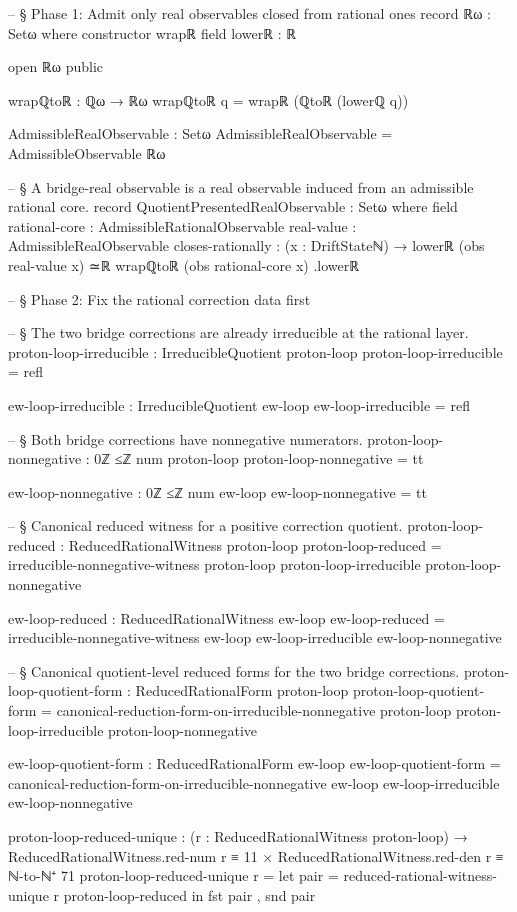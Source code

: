 \documentclass[11pt,a4paper]{book}
\begin{document}
\begin{code}
-- § Phase 1: Admit only real observables closed from rational ones
record ℝω : Setω where
  constructor wrapℝ
  field
    lowerℝ : ℝ

open ℝω public

wrapℚtoℝ : ℚω → ℝω
wrapℚtoℝ q = wrapℝ (ℚtoℝ (lowerℚ q))

AdmissibleRealObservable : Setω
AdmissibleRealObservable = AdmissibleObservable ℝω

-- § A bridge-real observable is a real observable induced from an admissible rational core.
record QuotientPresentedRealObservable : Setω where
  field
    rational-core : AdmissibleRationalObservable
    real-value    : AdmissibleRealObservable
    closes-rationally :
      (x : DriftStateℕ) →
      lowerℝ (obs real-value x) ≃ℝ wrapℚtoℝ (obs rational-core x) .lowerℝ

-- § Phase 2: Fix the rational correction data first

-- § The two bridge corrections are already irreducible at the rational layer.
proton-loop-irreducible : IrreducibleQuotient proton-loop
proton-loop-irreducible = refl

ew-loop-irreducible : IrreducibleQuotient ew-loop
ew-loop-irreducible = refl

-- § Both bridge corrections have nonnegative numerators.
proton-loop-nonnegative : 0ℤ ≤ℤ num proton-loop
proton-loop-nonnegative = tt

ew-loop-nonnegative : 0ℤ ≤ℤ num ew-loop
ew-loop-nonnegative = tt

-- § Canonical reduced witness for a positive correction quotient.
proton-loop-reduced : ReducedRationalWitness proton-loop
proton-loop-reduced =
  irreducible-nonnegative-witness proton-loop proton-loop-irreducible proton-loop-nonnegative

ew-loop-reduced : ReducedRationalWitness ew-loop
ew-loop-reduced =
  irreducible-nonnegative-witness ew-loop ew-loop-irreducible ew-loop-nonnegative

-- § Canonical quotient-level reduced forms for the two bridge corrections.
proton-loop-quotient-form : ReducedRationalForm proton-loop
proton-loop-quotient-form =
  canonical-reduction-form-on-irreducible-nonnegative
    proton-loop proton-loop-irreducible proton-loop-nonnegative

ew-loop-quotient-form : ReducedRationalForm ew-loop
ew-loop-quotient-form =
  canonical-reduction-form-on-irreducible-nonnegative
    ew-loop ew-loop-irreducible ew-loop-nonnegative

proton-loop-reduced-unique :
  (r : ReducedRationalWitness proton-loop) →
  ReducedRationalWitness.red-num r ≡ 11
  × ReducedRationalWitness.red-den r ≡ ℕ-to-ℕ⁺ 71
proton-loop-reduced-unique r =
  let pair = reduced-rational-witness-unique r proton-loop-reduced in
  fst pair , snd pair


\end{code}
\end{document}
